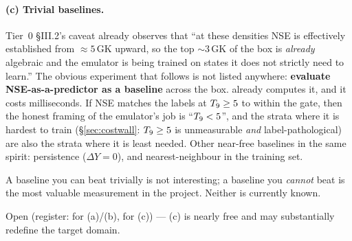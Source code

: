 \paragraph{(c) Trivial baselines.} Tier~0 \S III.2's caveat already observes
that ``at these densities NSE is effectively established from $\approx 5$\,GK
upward, so the top ${\sim}3$\,GK of the box is \emph{already} algebraic and the
emulator is being trained on states it does not strictly need to learn.'' The
obvious experiment that follows is not listed anywhere: \textbf{evaluate
NSE-as-a-predictor as a baseline} across the box.  already
computes it, and it costs milliseconds. If NSE matches the labels at
$T_{9} \ge 5$ to within the \Ye{} gate, then the honest framing of the emulator's
job is ``$T_{9} < 5$'', and the strata where it is hardest to train
(\S\ref{sec:costwall}: $T_{9} \ge 5$ is unmeasurable \emph{and}
label-pathological) are also the strata where it is least needed. Other
near-free baselines in the same spirit: persistence ($\Delta Y = 0$), and
nearest-neighbour in the training set.

\begin{invariant}
A baseline you can beat trivially is not interesting; a baseline you
\emph{cannot} beat is the most valuable measurement in the project. Neither is
currently known.
\end{invariant}

Open (register:  for (a)/(b),  for (c)) --- (c) is nearly
free and may substantially redefine the target domain.
